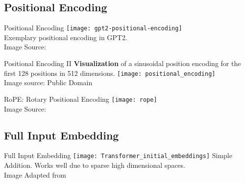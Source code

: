 \subsection{Positional Encoding}

\begin{frame}[c]{Positional Encoding}
    \texttt{[image: gpt2-positional-encoding]} \\
    \large
    Exemplary positional encoding in GPT2. \\
    \normalsize
    \textcolor[gray]{0.6}{
    Image Source: \cite{alammar_illustrated_2019}
}
\end{frame}

\begin{frame}[c]{Positional Encoding II}
    \large
    \textbf{Visualization} of a sinusoidal position encoding for the first 128 positions in 512 dimensions.
    \newline
    \newline
    \texttt{[image: positional\_encoding]} \\
    \normalsize
    Image source: Public Domain
\end{frame}

\begin{frame}[c]{RoPE: Rotary Positional Encoding}
    \texttt{[image: rope]} \\
    Image Source: \cite{su_roformer_2022}
\end{frame}



\subsection{Full Input Embedding}
\begin{frame}[c]{Full Input Embedding}
    \texttt{[image: Transformer\_initial\_embeddings]}
    \large
    Simple Addition. Works well due to sparse high dimensional spaces. \\
    \normalsize
    \textcolor[gray]{0.6}{
        Image Adapted from \cite{vaswani_attention_2017}
    }
\end{frame}


